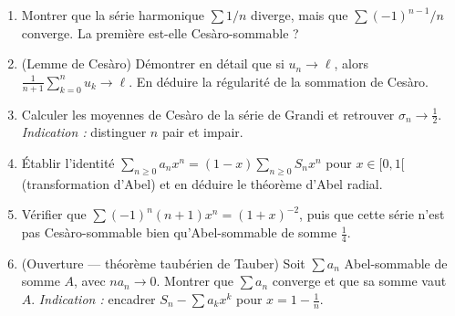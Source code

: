 \vspace{6pt}
\exolabel

\begin{mdframed}[style=exobar]
  \begin{enumerate}
    \item Montrer que la série harmonique $\sum 1/n$ diverge, mais que
          $\sum (-1)^{n-1}/n$ converge. La première est-elle Cesàro-sommable ?

    \item (Lemme de Cesàro) Démontrer en détail que si $u_n\to\ell$, alors
          $\tfrac{1}{n+1}\sum_{k=0}^{n}u_k\to\ell$. En déduire la régularité de
          la sommation de Cesàro.

    \item Calculer les moyennes de Cesàro de la série de Grandi et retrouver
          $\sigma_n\to\tfrac12$. \textit{Indication :} distinguer $n$ pair et
          impair.

    \item Établir l'identité $\sum_{n\geq0}a_n x^n=(1-x)\sum_{n\geq0}S_n x^n$
          pour $x\in[0,1[$ (transformation d'Abel) et en déduire le théorème
          d'Abel radial.

    \item Vérifier que $\sum(-1)^n(n+1)x^n=(1+x)^{-2}$, puis que cette série
          n'est pas Cesàro-sommable bien qu'Abel-sommable de somme $\tfrac14$.

    \item (Ouverture — théorème taubérien de Tauber) Soit $\sum a_n$
          Abel-sommable de somme $A$, avec $n a_n\to 0$. Montrer que $\sum a_n$
          converge et que sa somme vaut $A$. \textit{Indication :} encadrer
          $S_n-\sum a_k x^k$ pour $x=1-\tfrac1n$.
  \end{enumerate}
\end{mdframed}

